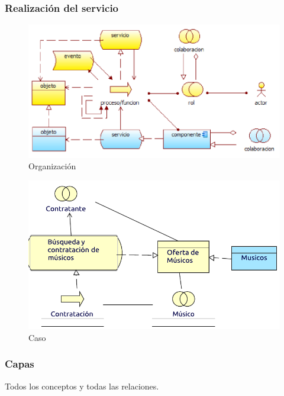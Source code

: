 \subsubsection{Realización del servicio}
\begin{figure}[h!]
	\centering
	\includegraphics[width=\linewidth]{Desarrollo/ArquitecturaEmpresarial/Tecnologia/imgs/realizacionMetamodelo.PNG}
	\caption{Organización}
\end{figure}
\newpage
{}

\begin{figure}[h!]
	\centering
	\includegraphics[width=\linewidth]{Desarrollo/ArquitecturaEmpresarial/Tecnologia/imgs/realizacion.pdf}
	\caption{Caso}
\end{figure}

\newpage

\subsubsection{Capas}
Todos los conceptos y todas las relaciones.

